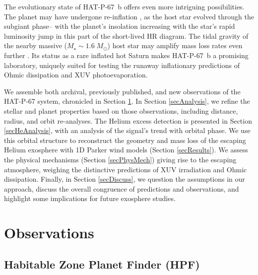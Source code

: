\documentclass[linenumbers, twocolumn, trackchanges]{aastex631}
\begin{document}
The evolutionary state of HAT-P-67~b offers even more intriguing possibilities.  The planet may have undergone re-inflation \citep{2022AJ....163...53S, 2022AJ....163..120G, 2023arXiv230306728G}, as the host star evolved through the subgiant phase-- with the planet's insolation increasing with the star's rapid luminosity jump in this part of the short-lived HR diagram.  The tidal gravity of the nearby massive ($M_\star \sim1.6\;M_\odot$) host star may amplify mass loss rates even further \citep{2007A&A...472..329E, 2023ApJ...945L..36T}. Its status as a rare inflated hot Saturn makes HAT-P-67~b a promising laboratory, uniquely suited for testing the runaway inflationary predictions of Ohmic dissipation and XUV photoevaporation.

We assemble both archival, previously published, and new observations of the HAT-P-67 system, chronicled in Section \ref{secObs}.  In Section \ref{secAnalysis}, we refine the stellar and planet properties based on those observations, including distance, radius, and orbit re-analyses.  The Helium excess detection is presented in Section \ref{secHeAnalysis}, with an analysis of the signal's trend with orbital phase.  We use this orbital structure to reconstruct the geometry and mass loss of the escaping Helium exosphere with 1D Parker wind models (Section \ref{secResults}).  We assess the physical mechanisms (Section \ref{secPhysMech}) giving rise to the escaping atmosphere, weighing the distinctive predictions of XUV irradiation and Ohmic dissipation.  Finally, in Section \ref{secDiscuss}, we question the assumptions in our approach, discuss the overall congruence of predictions and observations, and highlight some implications for future exosphere studies.


\section{Observations}\label{secObs}
\subsection{Habitable Zone Planet Finder (HPF)}
\end{document}
